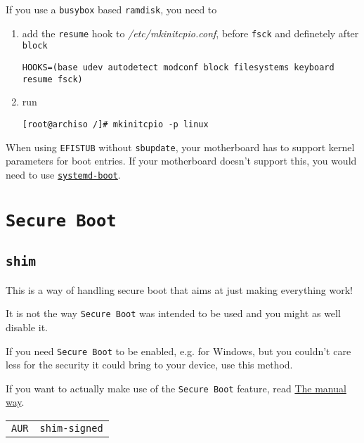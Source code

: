 \documentclass[9pt]{report}
\newenvironment{NOTE}
{\begin{tcolorbox}[colback=admonitionBG,coltitle=draculaFG,colframe=draculaBlue,colbacktitle=draculaBlue,title=NOTE]}
{\end{tcolorbox}}
\newenvironment{WARNING}
{\begin{tcolorbox}[colback=admonitionBG,coltitle=draculaBG,colframe=draculaOrange,colbacktitle=draculaOrange,title=WARNING]}
{\end{tcolorbox}}
\newenvironment{packagetable}
{\begin{longtabu}to \textwidth [b]{X[1,r]|X[1,l]}}
{\end{longtabu}}
\begin{document}
\begin{NOTE}
    If you use a \texttt{busybox} based \texttt{ramdisk}, you need to


    \begin{enumerate}

        \item{add the \texttt{resume} hook to \textit{/etc/mkinitcpio.conf}, before \texttt{fsck} and definetely after \texttt{block}}

            \begin{verbatim}
HOOKS=(base udev autodetect modconf block filesystems keyboard resume fsck)
            \end{verbatim}
        \item{run}

            \begin{verbatim}
[root@archiso /]# mkinitcpio -p linux
            \end{verbatim}
    \end{enumerate}

\end{NOTE}
\begin{NOTE}
    When using \texttt{EFISTUB} without \texttt{sbupdate}, your motherboard has to support kernel parameters for boot entries.
    If your motherboard doesn’t support this, you would need to use \href{https://wiki.archlinux.org/index.php/Systemd-boot}{\texttt{systemd-boot}}.

\end{NOTE}

\newpage

\hypertarget{x-secure-boot}{\section{\texttt{Secure Boot}}}

\newpage

\hypertarget{x-shim}{\subsection{\texttt{shim}}}
\begin{WARNING}
    This is a way of handling secure boot that aims at just making everything work!


    It is not the way \texttt{Secure Boot} was intended to be used and you might as well disable it.


    If you need \texttt{Secure Boot} to be enabled, e.g. for Windows, but you couldn’t care less for the security it could bring to your device, use this method.


    If you want to actually make use of the \texttt{Secure Boot} feature, read \hyperlink{x-manual-secure-boot-setup}{The manual way}.

\end{WARNING}
\begin{packagetable}
    \texttt{AUR} & \texttt{shim-signed} \\ 
\end{packagetable}
\end{document}

